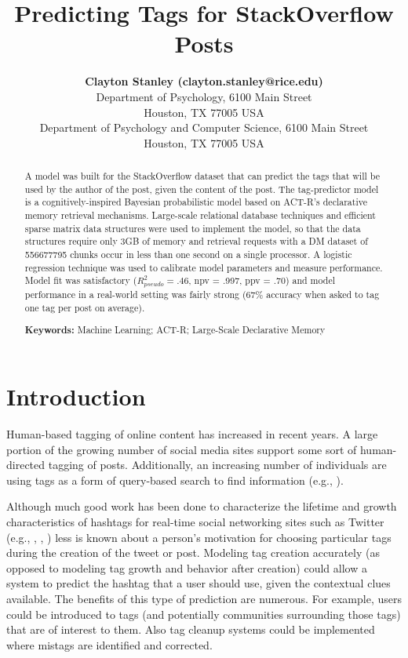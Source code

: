 \documentclass[10pt,letterpaper]{article}
\title{Predicting Tags for StackOverflow Posts}
\author{{\large \bf Clayton Stanley (clayton.stanley@rice.edu)} \\
  Department of Psychology, 6100 Main Street \\
  Houston, TX 77005 USA 
  \AND {\large \bf Mike Byrne (byrne@rice.edu)} \\
  Department of Psychology and Computer Science, 6100 Main Street \\
  Houston, TX 77005 USA }
\begin{document}
\maketitle

\begin{abstract}
  A model was built for the StackOverflow dataset that can predict the tags that will be used by the author of the post, given the content of the post.
  The tag-predictor model is a cognitively-inspired Bayesian probabilistic model based on ACT-R's declarative memory retrieval mechanisms.
  Large-scale relational database techniques and efficient sparse matrix data structures were used to implement the model,
  so that the data structures require only 3GB of memory and retrieval requests with a DM dataset of \num{556677795} chunks occur in less than one second on a single processor.
  A logistic regression technique was used to calibrate model parameters and measure performance.
  Model fit was satisfactory ($R_{pseudo}^{2}=.46$, npv = .997, ppv = .70) and model performance in a real-world setting was fairly strong (67\% accuracy when asked to tag one tag per post on average).

  \textbf{Keywords:} 
  Machine Learning; ACT-R; Large-Scale Declarative Memory
\end{abstract}

\section{Introduction}

Human-based tagging of online content has increased in recent years.
A large portion of the growing number of social media sites support some sort of human-directed tagging of posts.
Additionally, an increasing number of individuals are using tags as a form of query-based search to find information
(e.g., ).

Although much good work has been done to characterize the lifetime and growth characteristics of hashtags for real-time social networking sites such as Twitter
(e.g., , , )
less is known about a person's motivation for choosing particular tags during the creation of the tweet or post.
Modeling tag creation accurately (as opposed to modeling tag growth and behavior after creation) could allow a system to predict the hashtag that a user should use, given the contextual clues available.
The benefits of this type of prediction are numerous.
For example, users could be introduced to tags (and potentially communities surrounding those tags) that are of interest to them.
Also tag cleanup systems could be implemented where mistags are identified and corrected.
\end{document}
